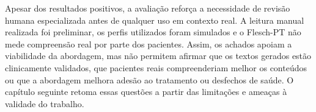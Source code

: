 Apesar dos resultados positivos, a avaliação reforça a necessidade de revisão humana especializada antes de qualquer uso em contexto real. A leitura manual realizada foi preliminar, os perfis utilizados foram simulados e o Flesch-PT não mede compreensão real por parte dos pacientes. Assim, os achados apoiam a viabilidade da abordagem, mas não permitem afirmar que os textos gerados estão clinicamente validados, que pacientes reais compreenderiam melhor os conteúdos ou que a abordagem melhora adesão ao tratamento ou desfechos de saúde. O capítulo seguinte retoma essas questões a partir das limitações e ameaças à validade do trabalho.

